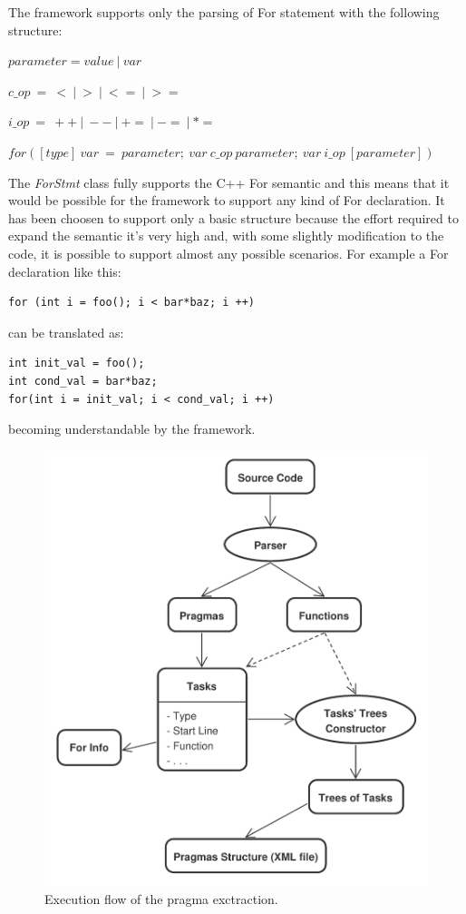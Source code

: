 \documentclass[a4paper,11pt,oneside]{book}
\begin{document}
The framework supports only the parsing of For statement with the following structure: \newline

$parameter = value \ | \ var$

$c\_op \ = \ < \ | \ > \ | \ <= \ | \ >= $

$i\_op \ = \ ++ \ | \ -- \ | \ += \ | \ -= \ | \ *=$ 

$for([type] \ var \ = \ parameter; \ var \ c\_op \ parameter; \ var \ i\_op \ [parameter])$ \newline


The \emph{ForStmt} class fully supports the C++ For semantic and this means that it would be possible for the framework to support any kind of For declaration. It has been choosen to support only a basic structure because the effort required to expand the semantic it’s very high and, with some slightly modification to the code, it is possible to support almost any possible scenarios. For example a For declaration like this: \\

\begin{lstlisting}[language=CCC]
for (int i = foo(); i < bar*baz; i ++)
\end{lstlisting} 
can be translated as: \\

\begin{lstlisting}[language=CCC]
int init_val = foo();
int cond_val = bar*baz;
for(int i = init_val; i < cond_val; i ++)  
\end{lstlisting}
becoming understandable by the framework.

\begin{figure}
\centering
\includegraphics[scale=0.5]{pragma_exctraction.pdf}
\caption{Execution flow of the pragma exctraction.}
\end{figure}
\end{document}
